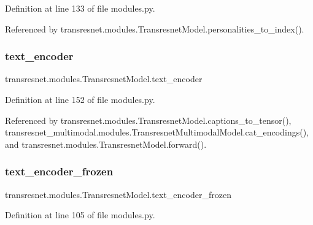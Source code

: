 Definition at line 133 of file modules.\+py.



Referenced by transresnet.\+modules.\+Transresnet\+Model.\+personalities\+\_\+to\+\_\+index().

\mbox{\label{classtransresnet_1_1modules_1_1TransresnetModel_ae2185f04a629b71ceebc00db1cadee6b}} 
\subsubsection{\texorpdfstring{text\+\_\+encoder}{text\_encoder}}
{\footnotesize\ttfamily transresnet.\+modules.\+Transresnet\+Model.\+text\+\_\+encoder}



Definition at line 152 of file modules.\+py.



Referenced by transresnet.\+modules.\+Transresnet\+Model.\+captions\+\_\+to\+\_\+tensor(), transresnet\+\_\+multimodal.\+modules.\+Transresnet\+Multimodal\+Model.\+cat\+\_\+encodings(), and transresnet.\+modules.\+Transresnet\+Model.\+forward().

\mbox{\label{classtransresnet_1_1modules_1_1TransresnetModel_ac5cca78fec98a84dd761d68782902c2c}} 
\subsubsection{\texorpdfstring{text\+\_\+encoder\+\_\+frozen}{text\_encoder\_frozen}}
{\footnotesize\ttfamily transresnet.\+modules.\+Transresnet\+Model.\+text\+\_\+encoder\+\_\+frozen}



Definition at line 105 of file modules.\+py.



